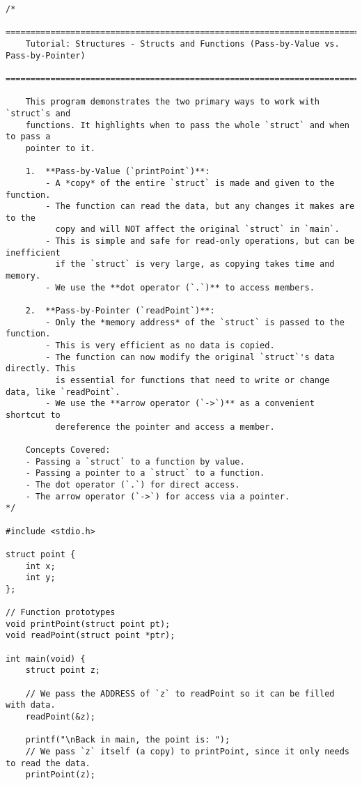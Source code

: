 \documentclass[11pt]{book}
\begin{document}
\begin{verbatim}
/*
    ================================================================================
    Tutorial: Structures - Structs and Functions (Pass-by-Value vs. Pass-by-Pointer)
    ================================================================================

    This program demonstrates the two primary ways to work with `struct`s and
    functions. It highlights when to pass the whole `struct` and when to pass a
    pointer to it.

    1.  **Pass-by-Value (`printPoint`)**:
        - A *copy* of the entire `struct` is made and given to the function.
        - The function can read the data, but any changes it makes are to the
          copy and will NOT affect the original `struct` in `main`.
        - This is simple and safe for read-only operations, but can be inefficient
          if the `struct` is very large, as copying takes time and memory.
        - We use the **dot operator (`.`)** to access members.

    2.  **Pass-by-Pointer (`readPoint`)**:
        - Only the *memory address* of the `struct` is passed to the function.
        - This is very efficient as no data is copied.
        - The function can now modify the original `struct`'s data directly. This
          is essential for functions that need to write or change data, like `readPoint`.
        - We use the **arrow operator (`->`)** as a convenient shortcut to
          dereference the pointer and access a member.

    Concepts Covered:
    - Passing a `struct` to a function by value.
    - Passing a pointer to a `struct` to a function.
    - The dot operator (`.`) for direct access.
    - The arrow operator (`->`) for access via a pointer.
*/

#include <stdio.h>

struct point {
    int x;
    int y;
};

// Function prototypes
void printPoint(struct point pt);
void readPoint(struct point *ptr);

int main(void) {
    struct point z;

    // We pass the ADDRESS of `z` to readPoint so it can be filled with data.
    readPoint(&z);

    printf("\nBack in main, the point is: ");
    // We pass `z` itself (a copy) to printPoint, since it only needs to read the data.
    printPoint(z);


\end{verbatim}
\end{document}
